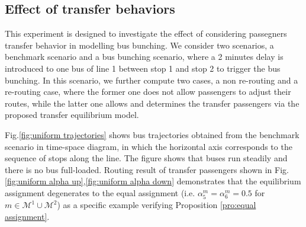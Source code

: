 \documentclass[smallextended]{svjour3}       %
\begin{document}
\begin{Abstract}
\subsection{Effect of transfer behaviors}\label{subsec: effc of trafer behaviors}
This experiment is designed to investigate the effect of considering passegners transfer behavior in modelling bus bunching. We consider two scenarios, a benchmark scenario and a bus bunching scenario, where a 2 minutes delay is introduced to one bus of line 1 between stop 1 and stop 2 to trigger the bus bunching. 
In this scenario, we further compute two cases, a non re-routing and a re-routing case, where the former one does not allow passengers to adjust their routes, while the latter one allows and determines the transfer passengers via the proposed transfer equilibrium model.

Fig.\ref{fig:uniform trajectories} shows bus trajectories obtained from the benchmark scenario in time-space diagram, in which the horizontal axis corresponds to the sequence of stops along the line.
The figure shows that buses run steadily and there is no bus full-loaded.
Routing result of transfer passengers shown in Fig.\ref{fig:uniform alpha up},\ref{fig:uniform alpha down} 
demonstrates that the equilibrium assignment degenerates to the equal assignment 
(i.e. $\alpha_{5}^{m}=\alpha_{6}^{m}=0.5$ for $m\in\mathcal{M}^{1}\cup\mathcal{M}^{2}$) as a specific example verifying Proposition \ref{pro:equal assignment}.


\end{Abstract}
\end{document}
